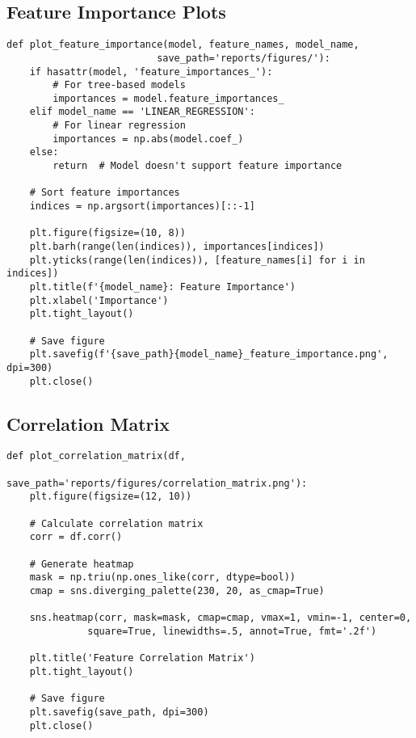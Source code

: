 \documentclass[12pt]{article}
\begin{document}
\subsection{Feature Importance Plots}
\label{subsec:feature_importance}

\begin{verbatim}
def plot_feature_importance(model, feature_names, model_name, 
                          save_path='reports/figures/'):
    if hasattr(model, 'feature_importances_'):
        # For tree-based models
        importances = model.feature_importances_
    elif model_name == 'LINEAR_REGRESSION':
        # For linear regression
        importances = np.abs(model.coef_)
    else:
        return  # Model doesn't support feature importance
    
    # Sort feature importances
    indices = np.argsort(importances)[::-1]
    
    plt.figure(figsize=(10, 8))
    plt.barh(range(len(indices)), importances[indices])
    plt.yticks(range(len(indices)), [feature_names[i] for i in indices])
    plt.title(f'{model_name}: Feature Importance')
    plt.xlabel('Importance')
    plt.tight_layout()
    
    # Save figure
    plt.savefig(f'{save_path}{model_name}_feature_importance.png', dpi=300)
    plt.close()
\end{verbatim}

\subsection{Correlation Matrix}
\label{subsec:correlation_matrix}

\begin{verbatim}
def plot_correlation_matrix(df, 
                          save_path='reports/figures/correlation_matrix.png'):
    plt.figure(figsize=(12, 10))
    
    # Calculate correlation matrix
    corr = df.corr()
    
    # Generate heatmap
    mask = np.triu(np.ones_like(corr, dtype=bool))
    cmap = sns.diverging_palette(230, 20, as_cmap=True)
    
    sns.heatmap(corr, mask=mask, cmap=cmap, vmax=1, vmin=-1, center=0,
              square=True, linewidths=.5, annot=True, fmt='.2f')
    
    plt.title('Feature Correlation Matrix')
    plt.tight_layout()
    
    # Save figure
    plt.savefig(save_path, dpi=300)
    plt.close()
\end{verbatim}
\end{document}
